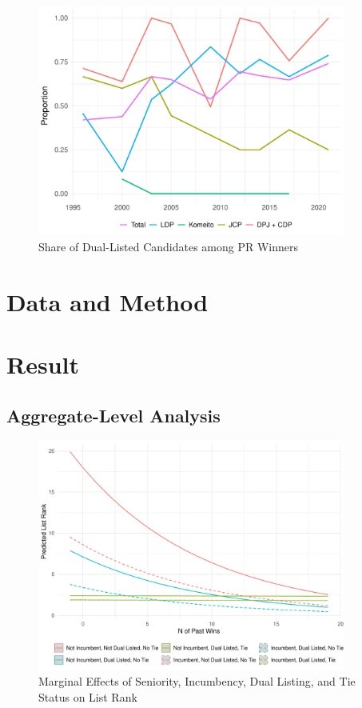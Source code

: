 \documentclass[a4paper, 11pt]{article}
\begin{document}
\begin{figure}[!htbp]
	\includegraphics[width = 0.9\textwidth]{../figure/paper/dual_nomination.pdf}
	\caption{Share of Dual-Listed Candidates among PR Winners}
	\label{fig:dual}
\end{figure}



\section{Data and Method} \label{sec: emp}


\section{Result} \label{sec: res}

\subsection{Aggregate-Level Analysis}


\begin{figure}[!htbp]
	\includegraphics[width = 0.9\textwidth]{../figure/paper/marginal_effects_rank.pdf}
	\caption{Marginal Effects of Seniority, Incumbency, Dual Listing, and Tie Status on List Rank}
	\label{fig:marginal_rank}
\end{figure}
\end{document}

